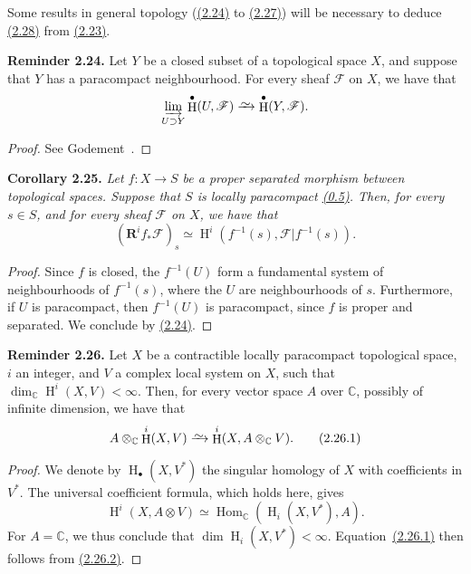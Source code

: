 \documentclass{report}
\newenvironment{itenv}[1]
  {\phantomsection\par\medskip\noindent\textbf{#1.}\itshape}
  {\medskip}
\newenvironment{rmenv}[1]
  {\phantomsection\par\medskip\noindent\textbf{#1.}\rmfamily}
  {\medskip}
\newcommand{\scr}[1]{{\mathscr{#1}}}
\newcommand{\CC}{\mathbb{C}}
\newcommand{\RR}{\mathbf{R}}
\newcommand{\simto}{\xrightarrow{\raisebox{-0.7ex}[0ex][0ex]{$\sim$}}}
\DeclareMathOperator{\Hom}{Hom}
\DeclareMathOperator{\HH}{H}
\begin{document}
Some results in general topology (\hyperref[I.2.24]{(2.24)} to \hyperref[I.2.27]{(2.27)}) will be necessary to deduce \hyperref[I.2.28]{(2.28)} from \hyperref[I.2.23]{(2.23)}.

\begin{rmenv}{Reminder 2.24}
\label{I.2.24}
  Let $Y$ be a closed subset of a topological space $X$, and suppose that $Y$ has a paracompact neighbourhood.
  For every sheaf $\scr{F}$ on $X$, we have that
  \[
    \varinjlim_{U\supset Y} \HH^\bullet(U,\scr{F}) \simto \HH^\bullet(Y,\scr{F}).
  \]
\end{rmenv}

\begin{proof}
  See Godement~\cite[II, 4.11.1, p.~193]{7}.
\end{proof}

\begin{itenv}{Corollary 2.25}
\label{I.2.25}
  Let $f\colon X\to S$ be a proper separated morphism between topological spaces.
  Suppose that $S$ is locally paracompact \hyperref[0.5]{(0.5)}.
  Then, for every $s\in S$, and for every sheaf $\scr{F}$ on $X$, we have that
  \[
    (\RR^i f_*\scr{F})_s \simeq \HH^i(f^{-1}(s), \scr{F}|f^{-1}(s)).
  \]
\end{itenv}

\begin{proof}
  Since $f$ is closed, the $f^{-1}(U)$ form a fundamental system of neighbourhoods of $f^{-1}(s)$, where the $U$ are neighbourhoods of $s$.
  Furthermore, if $U$ is paracompact, then $f^{-1}(U)$ is paracompact, since $f$ is proper and separated.
  We conclude by \hyperref[I.2.24]{(2.24)}.
\end{proof}

\begin{rmenv}{Reminder 2.26}
\label{I.2.26}
  Let $X$ be a contractible locally paracompact topological space, $i$ an integer, and $V$ a complex local system on $X$, such that $\dim_\CC\HH^i(X,V)<\infty$.
  Then, for every vector space $A$ over $\CC$, possibly of infinite dimension, we have that
  \[
  \label{I.2.26.1}
    A\otimes_\CC\HH^i(X,V) \simto \HH^i(X,A\otimes_\CC V).
  \tag{2.26.1}
  \]
\end{rmenv}

\begin{proof}
  We denote by $\HH_\bullet(X,V^*)$ the singular homology of $X$ with coefficients in $V^*$.
  The universal coefficient formula, which holds here, gives
  \[
  \label{I.2.26.2}
    \HH^i(X,A\otimes V) \simeq \Hom_\CC(\HH_i(X,V^*),A).
  \tag{2.26.2}
  \]
  For $A=\CC$, we thus conclude that $\dim\HH_i(X,V^*)<\infty$.
  Equation~\hyperref[I.2.26.1]{(2.26.1)} then follows from \hyperref[I.2.26.2]{(2.26.2)}.
\end{proof}
\end{document}
